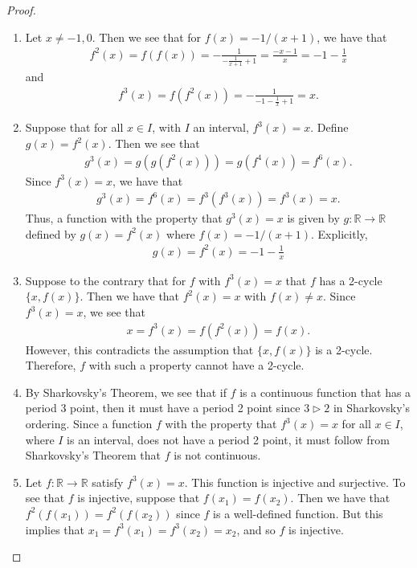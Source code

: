 \begin{proof}
  \begin{enumerate}
    \item Let $x\neq -1, 0$. Then we see that for $f(x) = -1/(x+1)$, we have that
      \begin{align*}
        f^2(x) = f(f(x)) = -\frac{1}{-\frac{1}{x+1}+1} = \frac{-x-1}{x} = -1 - \frac{1}{x}
      \end{align*}
      and
      \begin{align*}
        f^3(x) = f(f^2(x)) = -\frac{1}{-1 - \frac{1}{x} +1} = x.
      \end{align*}
    \item Suppose that for all $x\in I$, with $I$ an interval, $f^3(x) = x$. Define $g(x) = f^2(x)$.
      Then we see that
      \begin{align*}
        g^3(x) = g(g(f^2(x)))=g(f^4(x))=f^6(x).
      \end{align*}
      Since $f^3(x) = x$, we have that
      \begin{align*}
        g^3(x) = f^6(x) = f^3(f^3(x)) = f^3(x) = x.
      \end{align*}
      Thus, a function with the property that $g^3(x) = x$ is given by $g:\mathbb{R} \to \mathbb{R}$
      defined by $g(x) = f^2(x)$ where $f(x) = -1/(x+1)$. Explicitly,
      \begin{align*}
        g(x) = f^2(x) = -1 - \frac{1}{x}
      \end{align*}
    \item Suppose to the contrary that for $f$ with $f^3(x) = x$
      that $f$ has a 2-cycle $\{x, f(x)\}$. Then we have that $f^2(x) = x$ with $f(x) \neq x$.
      Since $f^3(x) = x$, we see that
      \begin{align*}
        x = f^3(x) = f(f^2(x)) = f(x).
      \end{align*}
      However, this contradicts the assumption that $\{x, f(x)\}$ is a 2-cycle. Therefore, $f$ with
      such a property cannot have a 2-cycle.
    \item By Sharkovsky's Theorem, we see that if $f$ is a continuous function
      that has a period 3 point, then it must have a period 2 point since $3 \triangleright 2$
      in Sharkovsky's ordering. Since a function $f$ with the property that $f^3(x) = x$ for
      all $x\in I$, where $I$ is an interval, does not have a period 2 point,
      it must follow from Sharkovsky's Theorem that $f$ is not continuous.
    \item Let $f:\mathbb{R}\to\mathbb{R}$ satisfy $f^3(x) = x$. This function is injective and surjective.
      To see that $f$ is injective, suppose that $f(x_1) = f(x_2)$. Then we have that
      $f^2(f(x_1)) = f^2(f(x_2))$ since $f$ is a well-defined function. But this implies that
      $x_1 = f^3(x_1) = f^3(x_2) = x_2$, and so $f$ is injective.


\end{enumerate}
\end{proof}
